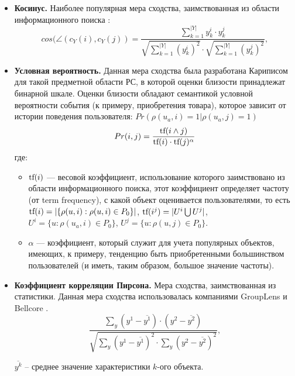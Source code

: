 \begin{itemize}
\item \textbf{Косинус.} \newline
Наиболее популярная мера сходства, заимствованная из области
информационного поиска \cite{ir1,ir2,ir3}:
\begin{equation} \label{sim-cos}
	cos(\angle(c_Y(i),c_Y(j)) = \frac{\sum \limits_{k=1}^{|Y|} y^i_k \cdot y^j_k}{
		\sqrt{ \sum \limits_{k=1}^{|Y|} (y^i_k)^2 } \cdot
		\sqrt{ \sum \limits_{k=1}^{|Y|} (y^j_k)^2 }},
\end{equation}

\item {\bf Условная вероятность.} \newline
Данная мера сходства была разработана Кариписом \cite{topn1} для такой
предметной области РС, в которой оценки близости принадлежат бинарной
шкале. Оценки близости обладают семантикой условной вероятности
события (к примеру, приобретения товара),
которое зависит от истории поведения пользователя:
$Pr( \rho(u_a,i) = 1 | \rho(u_a,j) = 1 )$
\begin{equation}
Pr(i,j) = \frac{\text{tf}(i \wedge j)}{\text{tf}(i) \cdot \text{tf}(j)^{\alpha}}
\end{equation}
где:
\begin{itemize}

\item $\text{tf}(i)$ --- весовой коэффициент, использование которого заимствовано из
области информационного поиска, этот коэффициент определяет частоту
(от term frequency), с какой объект оценивается пользователями, то есть
$\text{tf}(i) = |\{\rho(u,i): \rho(u,i) \in P_0\}|$,
$\text{tf}(i ^ j) = |U^i \bigcup U^j|$,
$U^i = \{u: \rho(u_a,i) \in P_0\}$,
$U^j = \{u: \rho(u,j) \in P_0\}$.

\item $\alpha$ --- коэффициент, который служит для учета популярных объектов,
имеющих, к примеру, тенденцию быть приобретенными большинством пользователей
(и иметь, таким образом, большое значение частоты).

\end{itemize}

\item {\bf Коэффициент корреляции Пирсона.} Мера сходства,
заимствованная из статистики. Данная мера сходства использовалась
компаниями GroupLens \cite{grouplens} и Bellcore \cite{bellcore}.
\begin{equation}
 \frac{\sum \limits_{y}(y^1 - \overline{y^1}) \cdot (y^2 -
                                           \overline{y^2})}
                {\sqrt{\sum \limits_{y}(y^1 - \overline{y^1})^2 \cdot
        \sum \limits_{y}(y^2 - \overline{y^2})^2}},
\end{equation}

$\overline{y^k}$ -- среднее значение характеристики $k$-ого объекта.
\end{itemize}
